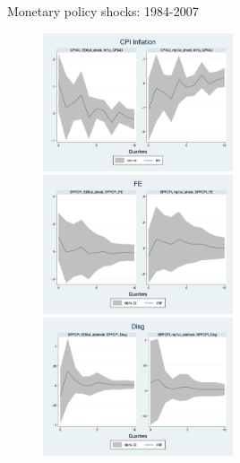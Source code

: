 \documentclass{beamer}
\begin{document}
\begin{frame}{Monetary policy shocks: 1984-2007}

\begin{figure}
	\includegraphics[width=0.5\textwidth,totalheight=0.28\textheight]{figuresDraft/CPIAU_ashocks_before2007.png}  \\
	\smallskip 
	\includegraphics[width=0.5\textwidth,totalheight=0.28\textheight]{figuresDraft/SPFFE_ashocks_before2007.png} \\
	\smallskip
	\includegraphics[width=0.5\textwidth,totalheight=0.28\textheight]{figuresDraft/SPFDisg_ab_ashocks_before2007.png} 
\end{figure}
\end{frame}
\end{document}
